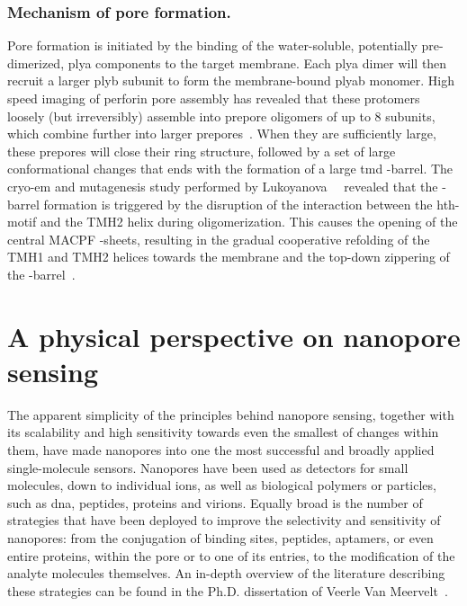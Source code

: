 \subsubsection{Mechanism of pore formation.}
%

Pore formation is initiated by the binding of the water-soluble, potentially pre-dimerized, \gls{plya}
components to the target membrane. Each \gls{plya} dimer will then recruit a larger \gls{plyb} subunit to form
the membrane-bound \gls{plyab} monomer. High speed imaging of perforin pore assembly has revealed that these
protomers loosely (but irreversibly) assemble into prepore oligomers of up to 8 subunits, which combine
further into larger prepores~\cite{Leung-2017}. When they are sufficiently large, these prepores will close
their ring structure, followed by a set of large conformational changes that ends with the formation of a
large \gls{tmd} \tb-barrel. The \gls{cryo-em} and mutagenesis study performed by
Lukoyanova~\etal{}~\cite{Lukoyanova-Kondos-2015} revealed that the \tb-barrel formation is triggered by the
disruption of the interaction between the \gls{hth}-motif and the {TMH2} helix during oligomerization. This
causes the opening of the central {MACPF} \tb-sheets, resulting in the gradual cooperative refolding of the
{TMH1} and {TMH2} helices towards the membrane and the top-down zippering of the
\tb-barrel~\cite{Reboul-2016}.


%
%

%
%
\section{A physical perspective on nanopore sensing}
%
\label{sec:np:physical_perspective}
%

The apparent simplicity of the principles behind nanopore sensing, together with its scalability and high
sensitivity towards even the smallest of changes within them, have made nanopores into one the most successful
and broadly applied single-molecule sensors. Nanopores have been used as detectors for small molecules, down
to individual ions, as well as biological polymers or particles, such as \gls{dna}, peptides, proteins and
virions. Equally broad is the number of strategies that have been deployed to improve the selectivity and
sensitivity of nanopores: from the conjugation of binding sites, peptides, aptamers, or even entire proteins,
within the pore or to one of its entries, to the modification of the analyte molecules themselves. An in-depth
overview of the literature describing these strategies can be found in the Ph.D. dissertation of Veerle Van
Meervelt~\cite{VanMeervelt-2017-PhD}.

